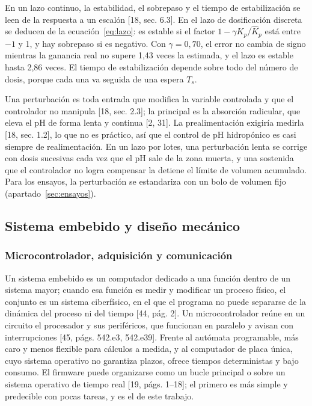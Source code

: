 En un lazo continuo, la estabilidad, el sobrepaso y el tiempo de estabilización se leen de la respuesta a un escalón [18, sec. 6.3]. En el lazo de dosificación discreta se deducen de la ecuación~\eqref{eq:lazo}: es estable si el factor $1-\gamma K_p/\hat K_p$ está entre $-1$ y 1, y hay sobrepaso si es negativo. Con $\gamma=0{,}70$, el error no cambia de signo mientras la ganancia real no supere 1,43 veces la estimada, y el lazo es estable hasta 2,86 veces. El tiempo de estabilización depende sobre todo del número de dosis, porque cada una va seguida de una espera $T_s$.

Una perturbación es toda entrada que modifica la variable controlada y que el controlador no manipula [18, sec. 2.3]; la principal es la absorción radicular, que eleva el pH de forma lenta y continua [2, 31]. La prealimentación exigiría medirla [18, sec. 1.2], lo que no es práctico, así que el control de pH hidropónico es casi siempre de realimentación. En un lazo por lotes, una perturbación lenta se corrige con dosis sucesivas cada vez que el pH sale de la zona muerta, y una sostenida que el controlador no logra compensar la detiene el límite de volumen acumulado. Para los ensayos, la perturbación se estandariza con un bolo de volumen fijo (apartado~\ref{sec:ensayos}).

\subsection{Sistema embebido y diseño mecánico}\label{sec:embebido}

\subsubsection{Microcontrolador, adquisición y comunicación}\label{sec:micro}
Un sistema embebido es un computador dedicado a una función dentro de un sistema mayor; cuando esa función es medir y modificar un proceso físico, el conjunto es un sistema ciberfísico, en el que el programa no puede separarse de la dinámica del proceso ni del tiempo [44, pág. 2]. Un microcontrolador reúne en un circuito el procesador y sus periféricos, que funcionan en paralelo y avisan con interrupciones [45, págs. 542.e3, 542.e39]. Frente al autómata programable, más caro y menos flexible para cálculos a medida, y al computador de placa única, cuyo sistema operativo no garantiza plazos, ofrece tiempos deterministas y bajo consumo. El firmware puede organizarse como un bucle principal o sobre un sistema operativo de tiempo real [19, págs. 1–18]; el primero es más simple y predecible con pocas tareas, y es el de este trabajo.

